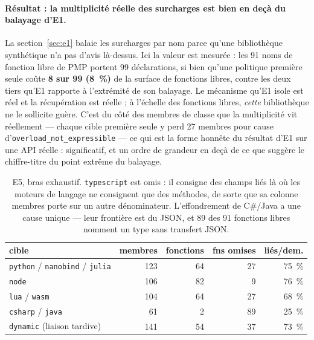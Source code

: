 \documentclass[11pt,a4paper]{article}
\newcommand{\code}[1]{\texttt{\small #1}}
\begin{document}
\paragraph{Résultat : la multiplicité réelle des surcharges est bien en deçà du
balayage d'E1.} La section~\ref{sec:e1} balaie les surcharges par nom parce
qu'une bibliothèque synthétique n'a pas d'avis là-dessus. Ici la valeur est
mesurée : les 91 noms de fonction libre de PMP portent 99 déclarations, si bien
qu'une politique \og première seule \fg{} coûte \textbf{8 sur 99 (8~\%)} de la
surface de fonctions libres, contre les deux tiers qu'E1 rapporte à l'extrémité
de son balayage. Le mécanisme qu'E1 isole est réel et la récupération est réelle ;
à l'échelle des fonctions libres, \emph{cette} bibliothèque ne le sollicite
guère. C'est du côté des membres de classe que la multiplicité vit réellement ---
chaque cible \og première seule \fg{} y perd 27 membres pour cause
d'\code{overload\_not\_expressible} --- ce qui est la forme honnête du résultat
d'E1 sur une API réelle : significatif, et un ordre de grandeur en deçà de ce que
suggère le chiffre-titre du point extrême du balayage.

\begin{table}[h]
\centering\small
\begin{tabular}{lrrrr}
\toprule
cible & membres & fonctions & fns omises & liés/dem. \\
\midrule
\code{python} / \code{nanobind} / \code{julia} & 123 & 64 & 27 & 75~\% \\
\code{node}       & 106 & 82 & 9  & 76~\% \\
\code{lua} / \code{wasm} & 104 & 64 & 27 & 68~\% \\
\code{csharp} / \code{java} & 61 & 2 & 89 & 25~\% \\
\code{dynamic} (liaison tardive) & 141 & 54 & 37 & 73~\% \\
\bottomrule
\end{tabular}
\caption{E5, bras exhaustif. \code{typescript} est omis : il consigne des champs
liés là où les moteurs de langage ne consignent que des méthodes, de sorte que sa
colonne \og membres \fg{} porte sur un autre dénominateur. L'effondrement de
C\#/Java a une cause unique --- leur frontière est du JSON, et 89 des 91
fonctions libres nomment un type sans transfert JSON.}
\label{tab:e5}
\end{table}
\end{document}
